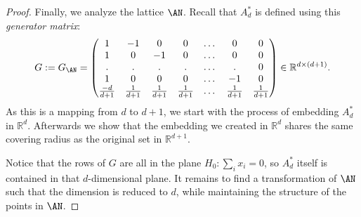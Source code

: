 \begin{proof}
    Finally, we analyze the lattice $\AN$.
    Recall that $A_d^*$ is defined using this \emph{generator matrix}:
    \begin{align} \label{eq:generaror}
        G:=G_{\AN}=
        \begin{pmatrix}
            1 & -1 & 0 & 0 & \dots & 0 & 0 \\
            1 & 0 & -1 & 0 & \dots & 0 & 0 \\
            . & . & . & . & \dots & . & 0 \\
            1 & 0 & 0 & 0 & \dots & -1 & 0 \\
            \frac{-d}{d+1} & \frac{1}{d+1} & \frac{1}{d+1} & \frac{1}{d+1} & \dots & \frac{1}{d+1} & \frac{1}{d+1} \\
        \end{pmatrix}\in \mathbb{R}^{d\times \left(d+1\right)}.
    \end{align}
    As this is a mapping from $d$ to $d+1$, we start with the process of embedding $A_d^*$ in $\mathbb{R}^d$. Afterwards we show that the embedding we created in $\mathbb{R}^d$ shares the same covering radius as the original set in $\mathbb{R}^{d+1}$.

    
    Notice that the rows of $G$ are all in the plane $H_0: \sum_i x_i = 0$, so $A_d^*$ itself is contained in that $d$-dimensional plane. It remains to find a transformation of $\AN$ such that the dimension is reduced to $d$, while maintaining the structure of the points in $\AN$.
    

\end{proof}
